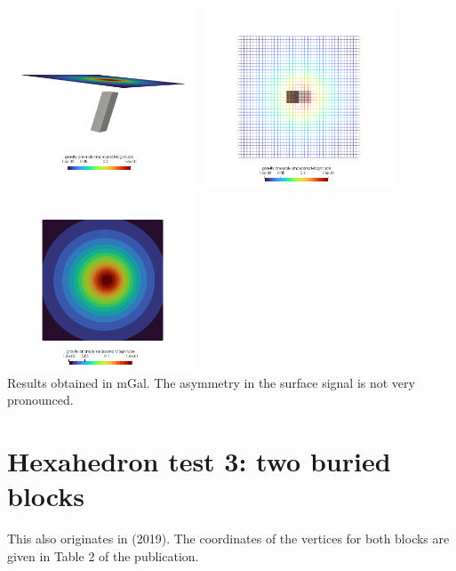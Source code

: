\begin{center}
\includegraphics[width=5.7cm]{python_codes/fieldstone_113/results/hex_test2/ggg1}
\includegraphics[width=5.7cm]{python_codes/fieldstone_113/results/hex_test2/ggg2}
\includegraphics[width=5.7cm]{python_codes/fieldstone_113/results/hex_test2/ggg3}\\
{\captionfont Results obtained in mGal. The asymmetry in the surface signal is not very pronounced.}
\end{center}

\section*{Hexahedron test 3: two buried blocks}

This also originates in \textcite{uwms19} (2019). The coordinates of
the vertices for both blocks are given in Table 2 of the publication.


